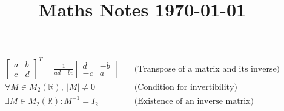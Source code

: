 \documentclass{article}
\title{Maths Notes \today}
\begin{document}
\maketitle
\begin{align}
	\begin{bmatrix}
		a & b \\
		c & d
	\end{bmatrix}^T = \frac{1}{ad - bc} \begin{bmatrix}
		d & -b \\
		-c & a
	\end{bmatrix} \quad &\text{(Transpose of a matrix and its inverse)} \\ 
	\forall M \in M_2(\mathbb{R}), \ |M| \neq 0 \quad &\text{(Condition for invertibility)} \\ 
	\exists M \in M_2(\mathbb{R}) : M^{-1} = I_2 \quad &\text{(Existence of an inverse matrix)}
\end{align}
\end{document}
